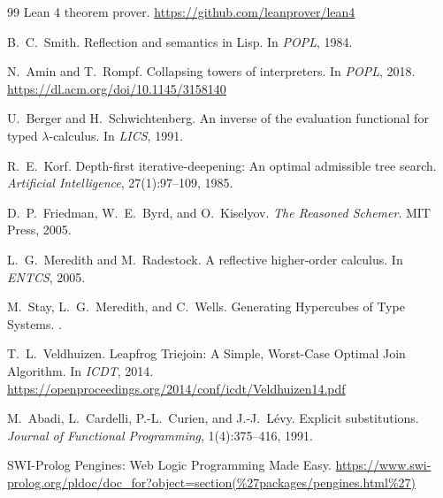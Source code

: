 \documentclass[11pt]{article}
\begin{document}
\begin{thebibliography}{99}
Lean 4 theorem prover.
\newblock \url{https://github.com/leanprover/lean4}

B.~C.~Smith.
\newblock Reflection and semantics in Lisp.
\newblock In \emph{POPL}, 1984.

N.~Amin and T.~Rompf.
\newblock Collapsing towers of interpreters.
\newblock In \emph{POPL}, 2018.
\newblock \url{https://dl.acm.org/doi/10.1145/3158140}

U.~Berger and H.~Schwichtenberg.
\newblock An inverse of the evaluation functional for typed $\lambda$-calculus.
\newblock In \emph{LICS}, 1991.

R.~E.~Korf.
\newblock Depth-first iterative-deepening: An optimal admissible tree search.
\newblock \emph{Artificial Intelligence}, 27(1):97--109, 1985.

D.~P.~Friedman, W.~E.~Byrd, and O.~Kiselyov.
\newblock \emph{The Reasoned Schemer}.
\newblock MIT Press, 2005.

L.~G.~Meredith and M.~Radestock.
\newblock A reflective higher-order calculus.
\newblock In \emph{ENTCS}, 2005.

M.~Stay, L.~G.~Meredith, and C.~Wells.
\newblock Generating Hypercubes of Type Systems.
.

T.~L.~Veldhuizen.
\newblock Leapfrog Triejoin: A Simple, Worst-Case Optimal Join Algorithm.
\newblock In \emph{ICDT}, 2014.
\newblock \url{https://openproceedings.org/2014/conf/icdt/Veldhuizen14.pdf}

M.~Abadi, L.~Cardelli, P.-L.~Curien, and J.-J.~L\'{e}vy.
\newblock Explicit substitutions.
\newblock \emph{Journal of Functional Programming}, 1(4):375--416, 1991.

SWI-Prolog Pengines: Web Logic Programming Made Easy.
\newblock \url{https://www.swi-prolog.org/pldoc/doc_for?object=section(%27packages/pengines.html%27)}

\end{thebibliography}
\end{document}
